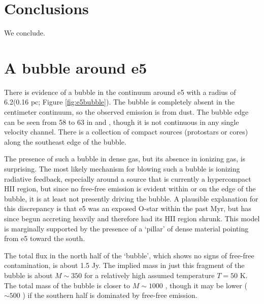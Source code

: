 \documentclass{aa}
\begin{document}








\section{Conclusions}
We conclude.






\appendix

\section{A bubble around e5}
There is evidence of a bubble in the continuum around e5 with a radius of
6.2\arcsec (0.16 pc; Figure \ref{fig:e5bubble}).  The bubble is completely
absent in the centimeter continuum, so the observed emission is from dust.  The
bubble edge can be seen from 58 \kms to 63 \kms in \ceighteeno and
\formaldehyde, though it is not continuous in any single velocity channel.
There is a collection of compact sources (protostars or cores) along the
southeast edge of the bubble.

The presence of such a bubble in dense gas, but its absence in ionizing gas, is
surprising.  The most likely mechanism for blowing such a bubble is ionizing
radiative feedback, especially around a source that is currently a hypercompact
HII region, but since no free-free emission is evident within or on the edge of
the bubble, it is at least not presently driving the bubble.  A plausible
explanation for this discrepancy is that e5 was an exposed O-star within the
past Myr, but has since begun accreting heavily and therefore had its HII
region shrunk.  This model is marginally supported by the presence of a `pillar'
of dense material pointing from e5 toward the south.

The total flux in the north half of the `bubble', which shows no signs of
free-free contamination, is about 1.5 Jy.  The implied mass in just this
fragment of the bubble is about $M\sim350$ \msun for a relatively high assumed
temperature $T=50$ K.  The total mass of the bubble is closer to $M\sim1000$
\msun, though it may be lower ($\sim500$ \msun) if the southern half is
dominated by free-free emission.
\end{document}
